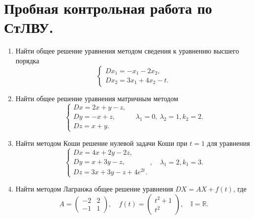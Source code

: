 \documentclass[a4paper, 12pt]{article}
\newcommand{\Rm}{\mathbb{R}}
\newcommand{\I}{\mathbb{I}}
\begin{document}
	\section*{Пробная контрольная работа по СтЛВУ.}
	\begin{enumerate}
		\item Найти общее решение уравнения методом сведения к уравнению высшего порядка
		$$\begin{cases}
			Dx_1 = -x_1 - 2x_2,\\
			Dx_2 = 3x_1+4x_2-t.
		\end{cases}$$
		\item Найти общее решение уравнения матричным методом
		$$\begin{cases}
			Dx = 2x + y - z,\\
			Dy = -x + z,\\
			Dz = x + y.
		\end{cases}\quad \lambda_1 = 0,\ \lambda_2 = 1, k_2 = 2.$$
	\item Найти методом Коши решение нулевой задачи Коши при $t = 1$ для уравнения 
	$$\begin{cases}
		Dx = 4x +2y - 2z,\\
		Dy = x + 3y - z,\\
		Dz = 3x + 3y - z + 4e^{2t}.
	\end{cases},\quad \lambda_1 = 2, k_1 = 3.$$
\item Найти методом Лагранжа общее решение уравнения $DX = AX + f(t)$, где 
$$A = \begin{pmatrix}
	-2 & 2\\
	-1 & 1
\end{pmatrix},\quad f(t) = \begin{pmatrix}
t^2 + 1\\
t^2
\end{pmatrix},\quad \I = \Rm.$$
	\end{enumerate}
\end{document}
